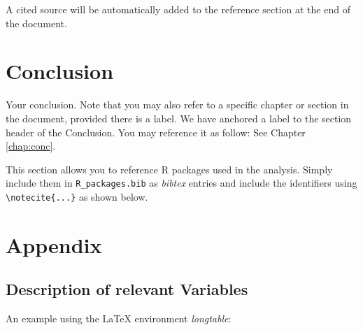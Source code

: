 \documentclass[11pt,a4paper]{article}
\begin{document}
A cited source will be automatically added to the reference section at
the end of the document.

\pagebreak

\hypertarget{conclusion}{%
\section{\texorpdfstring{Conclusion
\label{chap:conc}}{Conclusion }}\label{conclusion}}

Your conclusion. Note that you may also refer to a specific chapter or
section in the document, provided there is a label. We have anchored a
label to the section header of the Conclusion. You may reference it as
follow: See Chapter \ref{chap:conc}.

This section allows you to reference R packages used in the analysis.
Simply include them in \texttt{R\_packages.bib} as \emph{bibtex} entries
and include the identifiers using
\texttt{\textbackslash{}notecite\{...\}} as shown below.

\pagebreak

\printbibliography[title = References]
\cleardoublepage

\begin{refsection}
\nocite{R-base}
\nocite{R-Studio}

\printbibliography[title = Software-References]
\end{refsection}

\cleardoublepage
\appendix
\setcounter{table}{0}
\setcounter{figure}{0}
\renewcommand{\thetable}{A\arabic{table}}
\renewcommand{\thefigure}{A\arabic{figure}}


\hypertarget{appendix}{%
\section{Appendix}\label{appendix}}

\hypertarget{description-of-relevant-variables}{%
\subsection{\texorpdfstring{Description of relevant Variables
\label{app:A}}{Description of relevant Variables }}\label{description-of-relevant-variables}}

An example using the LaTeX environment \emph{longtable}:
\end{document}
